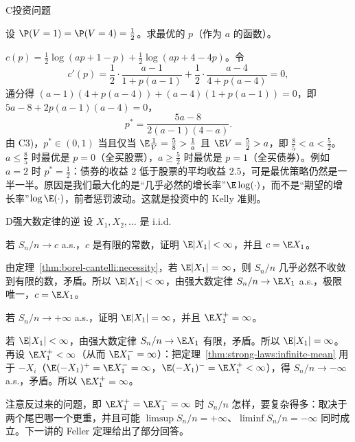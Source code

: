 \begin{probleme}{C}{投资问题}
\begin{questions}
\begin{solution}
\end{solution}
\item 设 $\P(V=1)=\P(V=4)=\frac12$。求最优的 $p$（作为 $a$ 的函数）。
\begin{solution}
$c(p)=\frac12\log(ap+1-p)+\frac12\log(ap+4-4p)$。令
\[
c'(p)=\frac12\cdot\frac{a-1}{1+p(a-1)}+\frac12\cdot\frac{a-4}{4+p(a-4)}=0,
\]
通分得 $(a-1)(4+p(a-4))+(a-4)(1+p(a-1))=0$，即 $5a-8+2p(a-1)(a-4)=0$，
\[
p^*=\frac{5a-8}{2(a-1)(4-a)} .
\]
由 C3)，$p^*\in(0,1)$ 当且仅当 $\E\frac1V=\frac58>\frac1a$ 且 $\E V=\frac52>a$，即 $\frac85<a<\frac52$。$a\leqslant\frac85$ 时最优是 $p=0$（全买股票），$a\geqslant\frac52$ 时最优是 $p=1$（全买债券）。例如 $a=2$ 时 $p^*=\frac12$：债券的收益 $2$ 低于股票的平均收益 $2.5$，可是最优策略仍然是一半一半。原因是我们最大化的是“几乎必然的增长率”$\E\log(\cdot)$，而不是“期望的增长率”$\log \E(\cdot)$，前者惩罚波动。这就是投资中的 Kelly 准则。
\end{solution}
\end{questions}
\end{probleme}

\thinkingpart

\begin{probleme}[问题]{D}{强大数定律的逆}
设 $X_1,X_2,\dots$ 是 i.i.d.
\begin{questions}
\item 若 $S_n/n\to c$ a.s.，$c$ 是有限的常数，证明 $\E\abs{X_1}<\infty$，并且 $c=\E X_1$。
\begin{solution}
由定理~\ref{thm:borel-cantelli:necessity}，若 $\E\abs{X_1}=\infty$，则 $S_n/n$ 几乎必然不收敛到有限的数，矛盾。所以 $\E\abs{X_1}<\infty$，由强大数定律 $S_n/n\to \E X_1$ a.s.，极限唯一，$c=\E X_1$。
\end{solution}
\item 若 $S_n/n\to+\infty$ a.s.，证明 $\E\abs{X_1}=\infty$，并且 $\E X_1^+=\infty$。
\begin{solution}
若 $\E\abs{X_1}<\infty$，由强大数定律 $S_n/n\to \E X_1$ 有限，矛盾。所以 $\E\abs{X_1}=\infty$。再设 $\E X_1^+<\infty$（从而 $\E X_1^-=\infty$）：把定理~\ref{thm:strong-laws:infinite-mean} 用于 $-X_i$（$\E(-X_1)^+=\E X_1^-=\infty$，$\E(-X_1)^-=\E X_1^+<\infty$），得 $S_n/n\to-\infty$ a.s.，矛盾。所以 $\E X_1^+=\infty$。

注意反过来的问题，即 $\E X_1^+=\E X_1^-=\infty$ 时 $S_n/n$ 怎样，要复杂得多：取决于两个尾巴哪一个更重，并且可能 $\limsup S_n/n=+\infty$、$\liminf S_n/n=-\infty$ 同时成立。下一讲的 Feller 定理给出了部分回答。
\end{solution}
\end{questions}
\end{probleme}

